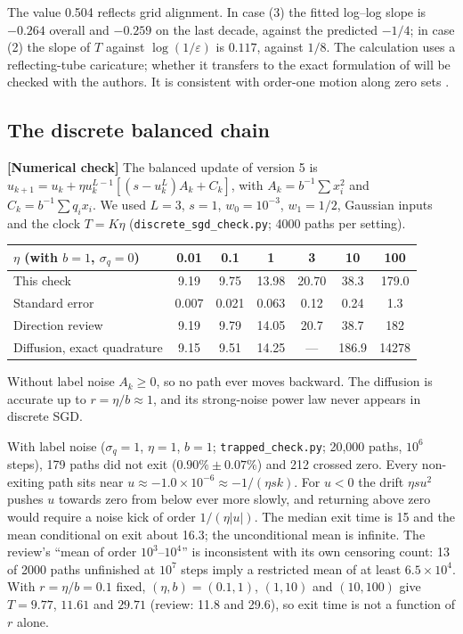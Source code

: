 \documentclass[11pt,a4paper]{article}
\newcommand{\eps}{\varepsilon}
\newcommand{\evl}[2]{{\small\bfseries\color{#1}[#2]}}
\newcommand{\LNum}{\evl{cnum}{Numerical check}}
\begin{document}
\noindent The value 0.504 reflects grid alignment. In case (3) the
fitted log--log slope is $-0.264$ overall and $-0.259$ on the last
decade, against the predicted $-1/4$; in case (2) the slope of $T$
against $\log(1/\eps)$ is $0.117$, against $1/8$. The calculation uses a
reflecting-tube caricature; whether it transfers to the exact
formulation of \cite{hennick2026} will be checked with the authors. It
is consistent with order-one motion along zero sets \cite{larsson2026}.

\subsection{The discrete balanced chain}

\LNum{} The balanced update of version 5 is
$u_{k+1}=u_k+\eta u_k^{L-1}[(s-u_k^L)A_k+C_k]$, with
$A_k=b^{-1}\sum x_i^2$ and $C_k=b^{-1}\sum q_ix_i$. We used $L=3$,
$s=1$, $w_0=10^{-3}$, $w_1=1/2$, Gaussian inputs and the clock $T=K\eta$
(\texttt{discrete\_sgd\_check.py}; 4000 paths per setting).

\begin{center}\small
\begin{tabular}{@{}lcccccc@{}}
\toprule
$\eta$ (with $b=1$, $\sigma_q=0$) & 0.01 & 0.1 & 1 & 3 & 10 & 100 \\
\midrule
This check & 9.19 & 9.75 & 13.98 & 20.70 & 38.3 & 179.0 \\
Standard error & 0.007 & 0.021 & 0.063 & 0.12 & 0.24 & 1.3 \\
Direction review & 9.19 & 9.79 & 14.05 & 20.7 & 38.7 & 182 \\
Diffusion, exact quadrature & 9.15 & 9.51 & 14.25 & --- & 186.9 & 14278 \\
\bottomrule
\end{tabular}
\end{center}

\noindent Without label noise $A_k\ge0$, so no path ever moves backward.
The diffusion is accurate up to $r=\eta/b\approx1$, and its strong-noise
power law never appears in discrete SGD.

With label noise ($\sigma_q=1$, $\eta=1$, $b=1$; \texttt{trapped\_check.py};
20{,}000 paths, $10^6$ steps), 179 paths did not exit ($0.90\%\pm0.07\%$)
and 212 crossed zero. Every non-exiting path sits near
$u\approx-1.0\times10^{-6}\approx-1/(\eta sk)$. For $u<0$ the drift
$\eta su^2$ pushes $u$ towards zero from below ever more slowly, and
returning above zero would require a noise kick of order $1/(\eta|u|)$.
The median exit time is 15 and the mean conditional on exit about 16.3;
the unconditional mean is infinite. The review's ``mean of order
$10^3$--$10^4$'' is inconsistent with its own censoring count: 13 of 2000
paths unfinished at $10^7$ steps imply a restricted mean of at least
$6.5\times10^4$. With $r=\eta/b=0.1$ fixed, $(\eta,b)=(0.1,1)$, $(1,10)$
and $(10,100)$ give $T=9.77$, $11.61$ and $29.71$ (review: 11.8 and 29.6),
so exit time is not a function of $r$ alone.
\end{document}
